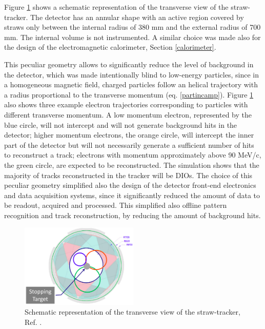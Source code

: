 Figure \ref{fig:sttrk} shows a schematic representation of the transverse view of the straw-tracker. 
The detector has an annular shape with an active region covered by straws only between the 
internal radius of 380 mm and the external radius of 700 mm. 
The internal volume is not instrumented. A similar choice 
was made also for the design of the electromagnetic calorimeter, Section \ref{calorimeter}. 

This peculiar geometry allows to significantly reduce the level of background in the detector, 
which was made intentionally blind to low-energy particles, since in a homogeneous magnetic field, 
charged particles follow an helical trajectory with a radius proportional to the transverse momentum
(eq. \ref{partincamp}).
Figure \ref{fig:sttrk} also shows three example electron trajectories corresponding 
to particles with different transverse momentum. A low momentum electron, 
represented by the blue circle, will not intercept and will not generate 
background hits in the detector; higher momentum electrons, the orange circle, 
will intercept the inner part of the detector but will not necessarily generate a 
sufficient number of hits to reconstruct a track; electrons with momentum approximately 
above 90 MeV/c, the green circle, are expected to be reconstructed. 
The simulation shows that the majority of tracks reconstructed in the tracker will be DIOs. 
The choice of this peculiar geometry simplified also the design of the detector 
front-end electronics and data acquisition systems, since it significantly reduced the amount of 
data to be readout, acquired and processed. This simplified also offline pattern 
recognition and track reconstruction, by reducing the amount of background hits.

\begin{figure}[!h]
    \centering
    \includegraphics[width =0.5\textwidth]{figures/png/Screenshot_20240306_214911.png}
    \caption{Schematic representation of the transverse view of the straw-tracker, Ref. \cite{trk}.}
    \label{fig:sttrk}
\end{figure}


